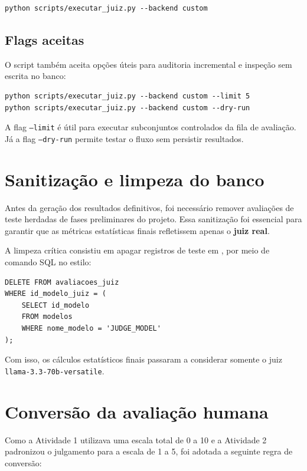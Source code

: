 \documentclass[12pt,a4paper]{article}
\begin{document}
\begin{lstlisting}[caption={Execucao do juiz com backend real}]
python scripts/executar_juiz.py --backend custom
\end{lstlisting}

\subsection{Flags aceitas}

O script também aceita opções úteis para auditoria incremental e inspeção sem escrita no banco:

\begin{lstlisting}[caption={Exemplos de flags da CLI}]
python scripts/executar_juiz.py --backend custom --limit 5
python scripts/executar_juiz.py --backend custom --dry-run
\end{lstlisting}

A flag \texttt{--limit} é útil para executar subconjuntos controlados da fila de avaliação. Já a flag \texttt{--dry-run} permite testar o fluxo sem persistir resultados.

\section{Sanitização e limpeza do banco}

Antes da geração dos resultados definitivos, foi necessário remover avaliações de teste herdadas de fases preliminares do projeto. Essa sanitização foi essencial para garantir que as métricas estatísticas finais refletissem apenas o \textbf{juiz real}.

A limpeza crítica consistiu em apagar registros de teste em , por meio de comando SQL no estilo:

\begin{lstlisting}[caption={Exemplo de limpeza dos registros de teste}]
DELETE FROM avaliacoes_juiz
WHERE id_modelo_juiz = (
    SELECT id_modelo
    FROM modelos
    WHERE nome_modelo = 'JUDGE_MODEL'
);
\end{lstlisting}

Com isso, os cálculos estatísticos finais passaram a considerar somente o juiz \texttt{llama-3.3-70b-versatile}.

\section{Conversão da avaliação humana}

Como a Atividade 1 utilizava uma escala total de 0 a 10 e a Atividade 2 padronizou o julgamento para a escala de 1 a 5, foi adotada a seguinte regra de conversão:
\end{document}

